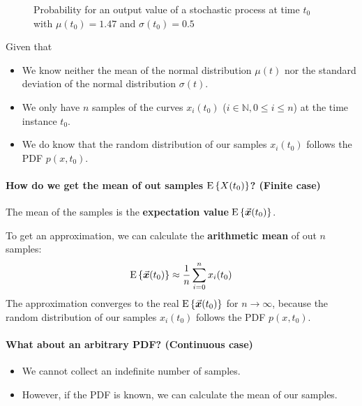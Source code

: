 \begin{refsection}
\begin{figure}[H]
	\caption{Probability for an output value of a stochastic process at time $t_0$ with $\mu(t_0) = 1.47$ and $\sigma(t_0) = 0.5$}
\end{figure}

Given that
\begin{itemize}
	\item We know neither the mean of the normal distribution $\mu(t)$ nor the standard deviation of the normal distribution $\sigma(t)$.
	\item We only have $n$ samples of the curves $x_i(t_0)$ ($i \in \mathbb{N}, 0 \leq i \leq n$) at the time instance $t_0$.
	\item We do know that the random distribution of our samples $x_i(t_0)$ follows the \ac{PDF} $p(x, t_0)$.
\end{itemize}

\paragraph{How do we get the mean of out samples $\mathrm{E}\left\{X(t_0)\right\}$? (Finite case)}

The mean of the samples is the  \textbf{expectation value} $\mathrm{E}\left\{\vec{\bm{x}}(t_0)\right\}$. 

To get an approximation, we can calculate the  \textbf{arithmetic mean} of out $n$ samples:
\begin{equation}
	\mathrm{E}\left\{\vec{\bm{x}}(t_0)\right\} \approx \frac{1}{n} \sum\limits_{i = 0}^{n} x_i(t_0)
	\label{eq:ch03:arith_mean}
\end{equation}
The approximation converges to the real $\mathrm{E}\left\{\vec{\bm{x}}(t_0)\right\}$ for $n \rightarrow \infty$, because the random distribution of our samples $x_i(t_0)$ follows the \ac{PDF} $p(x, t_0)$.

\paragraph{What about an arbitrary \ac{PDF}? (Continuous case)}

\begin{itemize}
	\item We cannot collect an indefinite number of samples.
	\item However, if the \ac{PDF} is known, we can calculate the mean of our samples.
\end{itemize}


\end{refsection}
